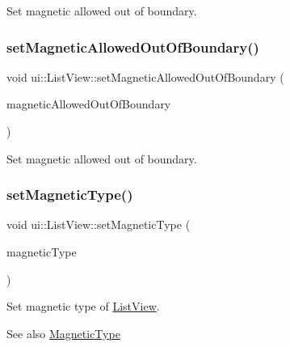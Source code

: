 Set magnetic allowed out of boundary. \mbox{\label{classui_1_1ListView_a0869253d15f9257c5313c5b156bc5ba5}} 
\subsubsection{\texorpdfstring{set\+Magnetic\+Allowed\+Out\+Of\+Boundary()}{setMagneticAllowedOutOfBoundary()}\hspace{0.1cm}{\footnotesize\ttfamily [2/2]}}
{\footnotesize\ttfamily void ui\+::\+List\+View\+::set\+Magnetic\+Allowed\+Out\+Of\+Boundary (\begin{DoxyParamCaption}\item[{bool}]{magnetic\+Allowed\+Out\+Of\+Boundary }\end{DoxyParamCaption})}

Set magnetic allowed out of boundary. \mbox{\label{classui_1_1ListView_ab94e44098f2d082aaf5dab97a4a02f61}} 
\subsubsection{\texorpdfstring{set\+Magnetic\+Type()}{setMagneticType()}\hspace{0.1cm}{\footnotesize\ttfamily [1/2]}}
{\footnotesize\ttfamily void ui\+::\+List\+View\+::set\+Magnetic\+Type (\begin{DoxyParamCaption}\item[{\hyperlink{classui_1_1ListView_a143593e762b785241572552b060aed6f}{Magnetic\+Type}}]{magnetic\+Type }\end{DoxyParamCaption})}

Set magnetic type of \hyperlink{classui_1_1ListView}{List\+View}. \begin{DoxySeeAlso}{See also}
{\ttfamily \hyperlink{classui_1_1ListView_a143593e762b785241572552b060aed6f}{Magnetic\+Type}} 
\end{DoxySeeAlso}
\mbox{\label{classui_1_1ListView_ab94e44098f2d082aaf5dab97a4a02f61}} 
